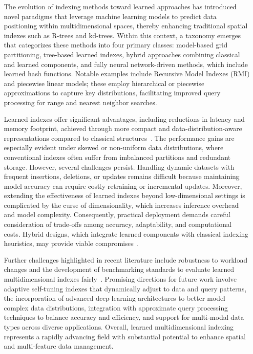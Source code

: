 \documentclass[sigconf]{acmart}
\begin{document}
The evolution of indexing methods toward learned approaches has introduced novel paradigms that leverage machine learning models to predict data positioning within multidimensional spaces, thereby enhancing traditional spatial indexes such as R-trees and kd-trees. Within this context, a taxonomy emerges that categorizes these methods into four primary classes: model-based grid partitioning, tree-based learned indexes, hybrid approaches combining classical and learned components, and fully neural network-driven methods, which include learned hash functions. Notable examples include Recursive Model Indexes (RMI) and piecewise linear models; these employ hierarchical or piecewise approximations to capture key distributions, facilitating improved query processing for range and nearest neighbor searches.

Learned indexes offer significant advantages, including reductions in latency and memory footprint, achieved through more compact and data-distribution-aware representations compared to classical structures~\cite{ref34}. The performance gains are especially evident under skewed or non-uniform data distributions, where conventional indexes often suffer from imbalanced partitions and redundant storage. However, several challenges persist. Handling dynamic datasets with frequent insertions, deletions, or updates remains difficult because maintaining model accuracy can require costly retraining or incremental updates. Moreover, extending the effectiveness of learned indexes beyond low-dimensional settings is complicated by the curse of dimensionality, which increases inference overhead and model complexity. Consequently, practical deployment demands careful consideration of trade-offs among accuracy, adaptability, and computational costs. Hybrid designs, which integrate learned components with classical indexing heuristics, may provide viable compromises~\cite{ref34}.

Further challenges highlighted in recent literature include robustness to workload changes and the development of benchmarking standards to evaluate learned multidimensional indexes fairly~\cite{ref34}. Promising directions for future work involve adaptive self-tuning indexes that dynamically adjust to data and query patterns, the incorporation of advanced deep learning architectures to better model complex data distributions, integration with approximate query processing techniques to balance accuracy and efficiency, and support for multi-modal data types across diverse applications. Overall, learned multidimensional indexing represents a rapidly advancing field with substantial potential to enhance spatial and multi-feature data management.
\end{document}
